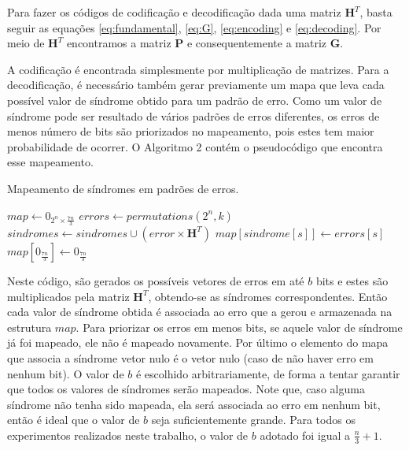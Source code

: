 Para fazer os códigos de codificação e decodificação dada uma matriz $\textbf{H}^T$, basta seguir as equações \ref{eq:fundamental}, \ref{eq:G}, \ref{eq:encoding} e \ref{eq:decoding}. Por meio de $\textbf{H}^T$ encontramos a matriz $\textbf{P}$ e consequentemente a matriz $\textbf{G}$. 

A codificação é encontrada simplesmente por multiplicação de matrizes. Para a decodificação, é necessário também gerar previamente um mapa que leva cada possível valor de síndrome obtido para um padrão de erro. Como um valor de síndrome pode ser resultado de vários padrões de erros diferentes, os erros de menos número de bits são priorizados no mapeamento, pois estes tem maior probabilidade de ocorrer. O Algoritmo 2 contém o pseudocódigo que encontra esse mapeamento.

\begin{algorithm}
\label{alg:mapeamento}
\caption{Mapeamento de síndromes em padrões de erros.}
\begin{algorithmic}[1]
\State $map \gets 0_{2^n \times \frac{7n}{3}}$
    \State $errors \gets permutations(2^n, k)$
        \State $sindromes \gets sindromes \cup (error \times \textbf{H}^T)$
    \EndFor
            \State $map[sindrome[s]] \gets errors[s]$            
        \EndIf
    \EndFor
\EndFor
\State $map[0_{\frac{7n}{3}}] \gets 0_{\frac{7n}{3}}$
\end{algorithmic}
\end{algorithm}

Neste código, são gerados os possíveis vetores de erros em até $b$ bits e estes são multiplicados pela matriz $\textbf{H}^T$, obtendo-se as síndromes correspondentes. Então cada valor de síndrome obtida é associada ao erro que a gerou e armazenada na estrutura $map$. Para priorizar os erros em menos bits, se aquele valor de síndrome já foi mapeado, ele não é mapeado novamente. Por último o elemento do mapa que associa a síndrome vetor nulo é o vetor nulo (caso de não haver erro em nenhum bit). O valor de $b$ é escolhido arbitrariamente, de forma a tentar garantir que todos os valores de síndromes serão mapeados. Note que, caso alguma síndrome não tenha sido mapeada, ela será associada ao erro em nenhum bit, então é ideal que o valor de $b$ seja suficientemente grande. Para todos os experimentos realizados neste trabalho, o valor de $b$ adotado foi igual a $\frac{n}{3} + 1$.
